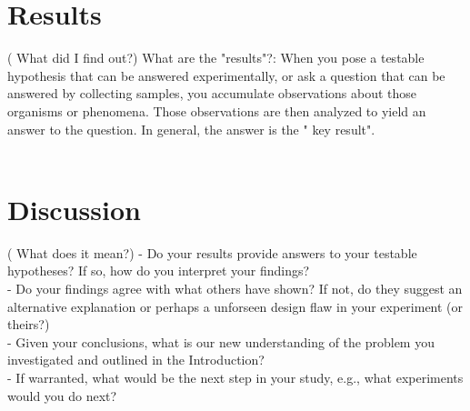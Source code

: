\documentclass{sig-alternate-05-2015}
\begin{document}
\section{Results}
( What did I find out?)
What are the "results"?: When you pose a testable hypothesis that can be answered experimentally, or ask a question that can be answered by collecting samples, you accumulate observations about those organisms or phenomena. Those observations are then analyzed to yield an answer to the question. In general, the answer is the " key result".
\\
\\
\section{Discussion}
( What does it mean?)
- Do your results provide answers to your testable hypotheses? If so, how do you interpret your findings?\\
- Do your findings agree with what others have shown? If not, do they suggest an alternative explanation or perhaps a unforseen design flaw in your experiment (or theirs?)\\
- Given your conclusions, what is our new understanding of the problem you investigated and outlined in the Introduction?\\
- If warranted, what would be the next step in your study, e.g., what experiments would you do next?\\
\\
\\


 
\end{document}
